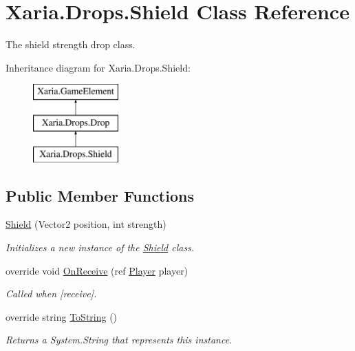 \hypertarget{classXaria_1_1Drops_1_1Shield}{}\section{Xaria.\+Drops.\+Shield Class Reference}
\label{classXaria_1_1Drops_1_1Shield}


The shield strength drop class.  


Inheritance diagram for Xaria.\+Drops.\+Shield\+:\begin{figure}[H]
\begin{center}
\leavevmode
\includegraphics[height=3.000000cm]{classXaria_1_1Drops_1_1Shield}
\end{center}
\end{figure}
\subsection*{Public Member Functions}
\begin{DoxyCompactItemize}
\item 
\hyperlink{classXaria_1_1Drops_1_1Shield_a0902539852e51ea1b6e167d7ff1802ca}{Shield} (Vector2 position, int strength)
\begin{DoxyCompactList}\small\item\em Initializes a new instance of the \hyperlink{classXaria_1_1Drops_1_1Shield}{Shield} class. \end{DoxyCompactList}\item 
override void \hyperlink{classXaria_1_1Drops_1_1Shield_a8c222c24381f32eab822d004c734aafd}{On\+Receive} (ref \hyperlink{classXaria_1_1Player}{Player} player)
\begin{DoxyCompactList}\small\item\em Called when \mbox{[}receive\mbox{]}. \end{DoxyCompactList}\item 
override string \hyperlink{classXaria_1_1Drops_1_1Shield_ae6a57bede76de2462ce37a7de4bac987}{To\+String} ()
\begin{DoxyCompactList}\small\item\em Returns a System.\+String that represents this instance. \end{DoxyCompactList}\end{DoxyCompactItemize}
